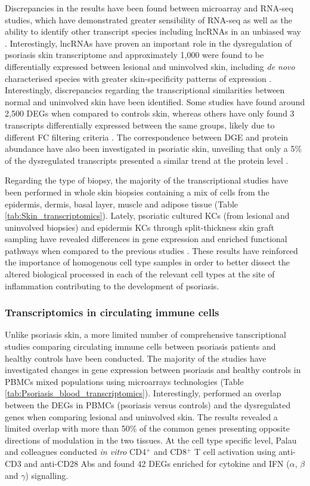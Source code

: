 Discrepancies in the results have been found between microarray and RNA-seq studies, which have demonstrated greater sensibility of RNA-seq as well as the ability to identify other transcript species including lncRNAs in an unbiased way \parencite{Jaabari2011, Li2014}. Interestingly, lncRNAs have proven an important role in the dysregulation of psoriasis skin transcriptome and approximately 1,000 were found to be differentially expressed between lesional and uninvolved skin, including \textit{de novo} characterised species with greater skin-specificity patterns of expression \parencite{Tsoi2015}. Interestingly, discrepancies regarding the transcriptional similarities between normal and uninvolved skin have been identified. Some studies have found around 2,500 DEGs when compared to controls skin, whereas others have only found 3 transcripts differentially expressed between the same groups, likely due to different FC filtering criteria \parencite{Keermann2015, Tsoi2015}. The correspondence between DGE and protein abundance have also been investigated in psoriatic skin, unveiling that only a 5\% of the dysregulated transcripts presented a similar trend at the protein level \parencite{Swindell2015}.   

Regarding the type of biopsy, the majority of the transcriptional studies have been performed in whole skin biopsies containing a mix of cells from the epidermis, dermis, basal layer, muscle and adipose tissue (Table \ref{tab:Skin_transcriptomics}). Lately, psoriatic cultured KCs (from lesional and uninvolved biopsies) and epidermis KCs through split-thickness skin graft sampling have revealed differences in gene expression and enriched functional pathways when compared to the previous studies \parencite{Swindell2017,Tervaniemi2016}. These results have reinforced the importance of homogenous cell type samples in order to better dissect the altered biological processed in each of the relevant cell types at the site of inflammation contributing to the development of psoriasis. 


\subsubsection{Transcriptomics in circulating immune cells}
Unlike psoriasis skin, a more limited number of comprehensive tanscriptional studies comparing circulating immune cells between psoriasis patients and healthy controls have been conducted. The majority of the studies have investigated changes in gene expression between psoriasis and healthy controls in PBMCs mixed populations using microarrays technologies (Table \ref{tab:Psoriasis_blood_transcriptomics}). Interestingly, \parencite{Coda2012} performed an overlap between the DEGs in PBMCs (psoriasis versus controls) and the dysregulated genes when comparing lesional and uninvolved skin. The results revealed a limited overlap with more than 50\% of the common genes presenting opposite directions of modulation in the two tissues. At the cell type specific level, Palau and colleagues conducted \textit{in vitro} CD4$^+$ and CD8$^+$ T cell activation using anti-CD3 and anti-CD28 Abs and found 42 DEGs enriched for cytokine and IFN ($\alpha$, $\beta$ and $\gamma$) signalling.


